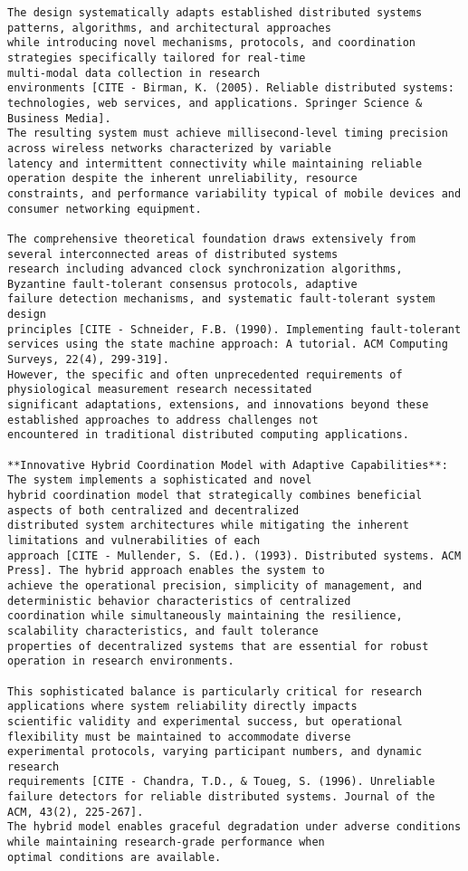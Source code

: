 \documentclass[12pt,a4paper]{report}
\begin{document}
\begin{verbatim}
The design systematically adapts established distributed systems patterns, algorithms, and architectural approaches
while introducing novel mechanisms, protocols, and coordination strategies specifically tailored for real-time
multi-modal data collection in research
environments [CITE - Birman, K. (2005). Reliable distributed systems: technologies, web services, and applications. Springer Science & Business Media].
The resulting system must achieve millisecond-level timing precision across wireless networks characterized by variable
latency and intermittent connectivity while maintaining reliable operation despite the inherent unreliability, resource
constraints, and performance variability typical of mobile devices and consumer networking equipment.

The comprehensive theoretical foundation draws extensively from several interconnected areas of distributed systems
research including advanced clock synchronization algorithms, Byzantine fault-tolerant consensus protocols, adaptive
failure detection mechanisms, and systematic fault-tolerant system design
principles [CITE - Schneider, F.B. (1990). Implementing fault-tolerant services using the state machine approach: A tutorial. ACM Computing Surveys, 22(4), 299-319].
However, the specific and often unprecedented requirements of physiological measurement research necessitated
significant adaptations, extensions, and innovations beyond these established approaches to address challenges not
encountered in traditional distributed computing applications.

**Innovative Hybrid Coordination Model with Adaptive Capabilities**: The system implements a sophisticated and novel
hybrid coordination model that strategically combines beneficial aspects of both centralized and decentralized
distributed system architectures while mitigating the inherent limitations and vulnerabilities of each
approach [CITE - Mullender, S. (Ed.). (1993). Distributed systems. ACM Press]. The hybrid approach enables the system to
achieve the operational precision, simplicity of management, and deterministic behavior characteristics of centralized
coordination while simultaneously maintaining the resilience, scalability characteristics, and fault tolerance
properties of decentralized systems that are essential for robust operation in research environments.

This sophisticated balance is particularly critical for research applications where system reliability directly impacts
scientific validity and experimental success, but operational flexibility must be maintained to accommodate diverse
experimental protocols, varying participant numbers, and dynamic research
requirements [CITE - Chandra, T.D., & Toueg, S. (1996). Unreliable failure detectors for reliable distributed systems. Journal of the ACM, 43(2), 225-267].
The hybrid model enables graceful degradation under adverse conditions while maintaining research-grade performance when
optimal conditions are available.


\end{verbatim}
\end{document}
